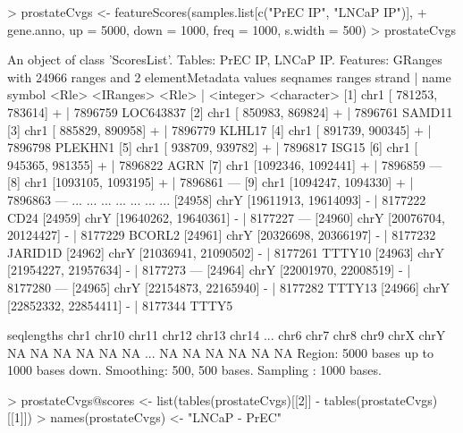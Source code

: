 \begin{Schunk}
\begin{Sinput}
> prostateCvgs <- featureScores(samples.list[c("PrEC IP", "LNCaP IP")], 
+     gene.anno, up = 5000, down = 1000, freq = 1000, s.width = 500)
> prostateCvgs
\end{Sinput}
\begin{Soutput}
An object of class 'ScoresList'.
Tables: PrEC IP, LNCaP IP.
Features:
GRanges with 24966 ranges and 2 elementMetadata values
        seqnames               ranges strand   |      name      symbol
           <Rle>            <IRanges>  <Rle>   | <integer> <character>
    [1]     chr1   [ 781253,  783614]      +   |   7896759   LOC643837
    [2]     chr1   [ 850983,  869824]      +   |   7896761      SAMD11
    [3]     chr1   [ 885829,  890958]      +   |   7896779      KLHL17
    [4]     chr1   [ 891739,  900345]      +   |   7896798     PLEKHN1
    [5]     chr1   [ 938709,  939782]      +   |   7896817       ISG15
    [6]     chr1   [ 945365,  981355]      +   |   7896822        AGRN
    [7]     chr1   [1092346, 1092441]      +   |   7896859         ---
    [8]     chr1   [1093105, 1093195]      +   |   7896861         ---
    [9]     chr1   [1094247, 1094330]      +   |   7896863         ---
    ...      ...                  ...    ... ...       ...         ...
[24958]     chrY [19611913, 19614093]      -   |   8177222        CD24
[24959]     chrY [19640262, 19640361]      -   |   8177227         ---
[24960]     chrY [20076704, 20124427]      -   |   8177229      BCORL2
[24961]     chrY [20326698, 20366197]      -   |   8177232     JARID1D
[24962]     chrY [21036941, 21090502]      -   |   8177261      TTTY10
[24963]     chrY [21954227, 21957634]      -   |   8177273         ---
[24964]     chrY [22001970, 22008519]      -   |   8177280         ---
[24965]     chrY [22154873, 22165940]      -   |   8177282      TTTY13
[24966]     chrY [22852332, 22854411]      -   |   8177344       TTTY5

seqlengths
  chr1 chr10 chr11 chr12 chr13 chr14 ...  chr6  chr7  chr8  chr9  chrX  chrY
    NA    NA    NA    NA    NA    NA ...    NA    NA    NA    NA    NA    NA
Region: 5000 bases up to 1000 bases down.
Smoothing: 500, 500 bases.
Sampling : 1000 bases.
\end{Soutput}
\begin{Sinput}
> prostateCvgs@scores <- list(tables(prostateCvgs)[[2]] - tables(prostateCvgs)[[1]])
> names(prostateCvgs) <- "LNCaP - PrEC"
\end{Sinput}
\end{Schunk}
